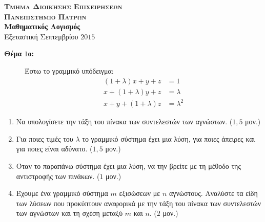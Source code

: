 \documentclass[a4paper,12pt]{article}
\begin{document}
\thispagestyle{empty}
\begin{center}
    {\large\bfseries \textsc{Τμημα Διοικησης Επιχειρησεων \\
        Πανεπιστημιο Πατρων}} \\[0,5cm]
        \textbf{Μαθηματικός Λογισμός} \\[0,5cm]
        Εξεταστική Σεπτεμβρίου $2015$
    \end{center}
    \vspace{0,5cm}
    \begin{description}

        \item [{\bfseries Θέμα $1$ο:}] Έστω το γραμμικό υπόδειγμα:
            \begin{align*}
                (1+\lambda)x + y + z &= 1 \\
                x + (1 + \lambda)y + z &=\lambda\\
                x+y+(1+\lambda)z&=\lambda^2
            \end{align*}
    \end{description}

    \begin{enumerate}

        \item Να υπολογίσετε την τάξη του πίνακα των συντελεστών των αγνώστων. ($1,5$ μον.)
        \item Για ποιες τιμές του $\lambda$ το γραμμικό σύστημα έχει μια λύση, για ποιες άπειρες και για ποιες είναι αδύνατο. ($1,5$ μον.)
        \item Όταν το παραπάνω σύστημα έχει μια λύση, να την βρείτε με τη μέθοδο της αντιστροφής των πινάκων. ($1$ μον.)
        \item Έχουμε ένα γραμμικό σύστημα $m$ εξισώσεων με $n$ αγνώστους. Αναλύστε τα είδη των λύσεων που προκύπτουν αναφορικά με την τάξη του πίνακα των συντελεστών των αγνώστων και τη σχέση μεταξύ $m$ και $n$. ($2$ μον.)

    \end{enumerate}



    
\end{document}
